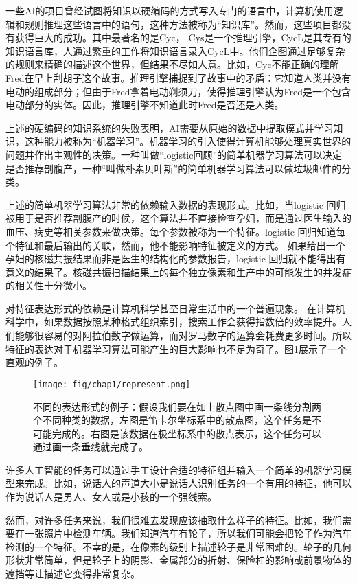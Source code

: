一些AI的项目曾经试图将知识以硬编码的方式写入专门的语言中，计算机使用逻辑和规则推理这些语言中的语句，这种方法被称为“知识库”。然而，这些项目都没有获得巨大的成功。其中最著名的是Cyc， Cys是一个推理引擎，CycL是其专有的知识语言库，人通过繁重的工作将知识语言录入CycL中。他们企图通过足够复杂的规则来精确的描述这个世界，但结果不尽如人意。比如，Cyc不能正确的理解Fred在早上刮胡子这个故事。推理引擎捕捉到了故事中的矛盾：它知道人类并没有电动的组成部分；但由于Fred拿着电动剃须刀，使得推理引擎认为Fred是一个包含电动部分的实体。因此，推理引擎不知道此时Fred是否还是人类。

上述的硬编码的知识系统的失败表明，AI需要从原始的数据中提取模式并学习知识，这种能力被称为“机器学习”。机器学习的引入使得计算机能够处理真实世界的问题并作出主观性的决策。一种叫做“logistic回顾”的简单机器学习算法可以决定是否推荐剖腹产，一种“叫做朴素贝叶斯”的简单机器学习算法可以做垃圾邮件的分类。


上述的简单机器学习算法非常的依赖输入数据的表现形式。比如，当logistic 回归被用于是否推荐剖腹产的时候，这个算法并不直接检查孕妇，而是通过医生输入的血压、病史等相关参数来做决策。每个参数被称为一个特征。logistic 回归知道每个特征和最后输出的关联，然而，他不能影响特征被定义的方式。 如果给出一个孕妇的核磁共振结果而非是医生的结构化的参数报告，logistic 回归就不能得出有意义的结果了。核磁共振扫描结果上的每个独立像素和生产中的可能发生的并发症的相关性十分微小。


对特征表达形式的依赖是计算机科学甚至日常生活中的一个普遍现象。 在计算机科学中，如果数据按照某种格式组织索引，搜索工作会获得指数倍的效率提升。人们能够很容易的对阿拉伯数字做运算，而对罗马数字的运算会耗费更多时间。所以特征的表达对于机器学习算法可能产生的巨大影响也不足为奇了。图\ref{fig:represent}展示了一个直观的例子。
\begin{figure}[htbp] %
   \centering
   \texttt{[image: fig/chap1/represent.png]} 
   \caption{不同的表达形式的例子：假设我们要在如上散点图中画一条线分割两个不同种类的数据，左图是笛卡尔坐标系中的散点图，这个任务是不可能完成的。右图是该数据在极坐标系中的散点表示，这个任务可以通过画一条垂线就完成了。}
   \label{fig:represent}
\end{figure}

许多人工智能的任务可以通过手工设计合适的特征组并输入一个简单的机器学习模型来完成。比如，说话人的声道大小是说话人识别任务的一个有用的特征，他可以作为说话人是男人、女人或是小孩的一个强线索。


然而，对许多任务来说，我们很难去发现应该抽取什么样子的特征。比如，我们需要在一张照片中检测车辆。我们知道汽车有轮子，所以我们可能会把轮子作为汽车检测的一个特征。不幸的是，在像素的级别上描述轮子是非常困难的。轮子的几何形状非常简单，但是轮子上的阴影、金属部分的折射、保险杠的影响或前景物体的遮挡等让描述它变得非常复杂。


